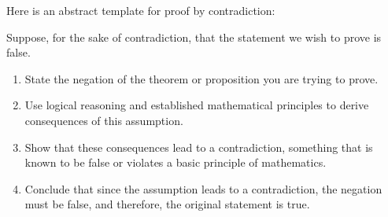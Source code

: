 \documentclass[
	12pt, %
	fleqn, %
	a4paper, %
]{LegrandOrangeBook}
\begin{document}
Here is an abstract template for proof by contradiction:

Suppose, for the sake of contradiction, that the statement we wish to prove is false.

\begin{enumerate}
    \item State the negation of the theorem or proposition you are trying to prove.
    \item Use logical reasoning and established mathematical principles to derive consequences of this assumption.
    \item Show that these consequences lead to a contradiction, something that is known to be false or violates a basic principle of mathematics.
    \item Conclude that since the assumption leads to a contradiction, the negation must be false, and therefore, the original statement is true.
\end{enumerate}
\end{document}
